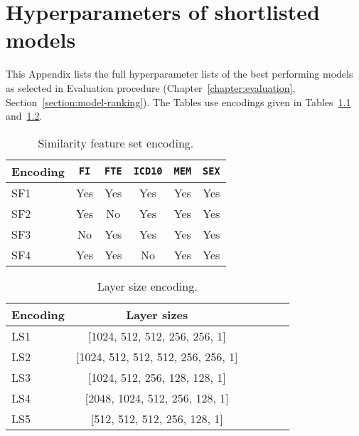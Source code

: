 \chapter{Hyperparameters of shortlisted models}

This Appendix lists the full hyperparameter lists of the best performing models as selected in Evaluation procedure (Chapter~\ref{chapter:evaluation}, Section~\ref{section:model-ranking}). The Tables use encodings given in Tables~\ref{table:sf-encoding} and~\ref{table:ls-encoding}.

\begin{table}[h]
    \caption{Similarity feature set encoding.}\label{table:sf-encoding}
    \centering
    \small
    \begin{tabular}{lccccc}
        \hline
    \textbf{Encoding} & \texttt{FI} &  \texttt{FTE}& \texttt{ICD10}& \texttt{MEM}& \texttt{SEX}\\  \hline
        SF1 & Yes & Yes & Yes & Yes & Yes \\
        SF2 & Yes & No & Yes & Yes & Yes \\
        SF3 & No & Yes & Yes & Yes & Yes \\
        SF4 & Yes & Yes & No & Yes & Yes \\ \hline
\end{tabular}
\end{table}

\begin{table}[h]
    \caption{Layer size encoding.}\label{table:ls-encoding}
    \centering
    \small
    \begin{tabular}{lccccc}
        \hline
    \textbf{Encoding} & \textbf{Layer sizes} \\  \hline
        LS1 & [1024, 512, 512, 256, 256, 1] \\ 
        LS2 & [1024, 512, 512, 512, 256, 256, 1] \\
        LS3 & [1024, 512, 256, 128, 128, 1] \\
        LS4 & [2048, 1024, 512, 256, 128, 1] \\
        LS5 & [512, 512, 512, 256, 128, 1] \\ \hline
\end{tabular}
\end{table}


